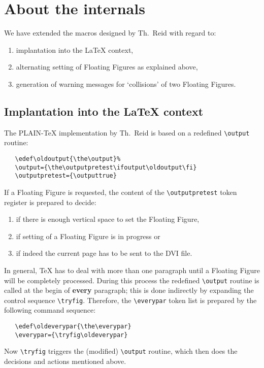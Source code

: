 \section{About the internals}
 We have extended the macros designed by Th.~Reid with regard to:
 \begin{enumerate}
 \item implantation into the \LaTeX{} context,
 \item alternating setting of Floating Figures as explained above,
 \item generation of warning messages for `collisions' of two Floating Figures. 
 \end{enumerate}
 \subsection{Implantation into the \LaTeX{} context}
 The PLAIN-\TeX{} implementation by Th.~Reid
 is based on a redefined \verb+\output+ routine:
 \begin{verbatim}
   \edef\oldoutput{\the\output}%
   \output={\the\outputpretest\ifoutput\oldoutput\fi}
   \outputpretest={\outputtrue}
 \end{verbatim}
 If a Floating Figure is requested, 
 the content of the
 \verb+\outputpretest+ token register is prepared to decide:
 \begin{enumerate}
 \item if there is enough vertical space to set the Floating Figure,
 \item if setting of a Floating Figure is in progress or
 \item if indeed the current page has to be sent to the DVI file.
 \end{enumerate}
 In general, \TeX{} has to deal with more than one paragraph until
 a Floating Figure will be completely processed.
 During this process
 the redefined \verb+\output+ routine is
 called at the begin of {\bf every} paragraph; 
 this is done indirectly
 by expanding the control sequence \verb+\tryfig+.
 Therefore, the \verb+\everypar+ token
 list is prepared by the following command sequence:
 \begin{verbatim}
   \edef\oldeverypar{\the\everypar}
   \everypar={\tryfig\oldeverypar}
 \end{verbatim}
 Now \verb+\tryfig+ triggers the (modified)
 \verb+\output+ routine, which then does the decisions
 and actions mentioned above.
  
